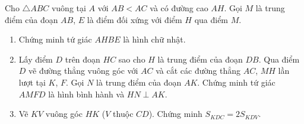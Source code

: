 \begin{bt}%
Cho $\triangle ABC$ vuông tại $A$ với $AB < AC$ và có đường cao $AH$. Gọi $M$ là trung điểm của đoạn $AB$, $E$ là điểm đối xứng với điểm $H$ qua điểm $M$.
\begin{enumerate}
\item Chứng minh tứ giác $AHBE$ là hình chữ nhật.
\item Lấy điểm $D$ trên đoạn $HC$ sao cho $H$ là trung điểm của đoạn $DB$. Qua điểm $D$ vẽ đường thẳng vuông góc với $AC$ và cắt các đường thẳng $AC$, $MH$ lần lượt tại $K$, $F$. Gọi $N$ là
trung điểm của đoạn $AK$. Chứng minh tứ giác $AMFD$ là hình bình hành và $HN\perp AK$.
\item Vẽ $KV$ vuông góc $HK$ ($V$ thuộc $CD$). Chứng minh $S_{KDC}=2S_{KDV}$.
\end{enumerate}
\end{bt}
